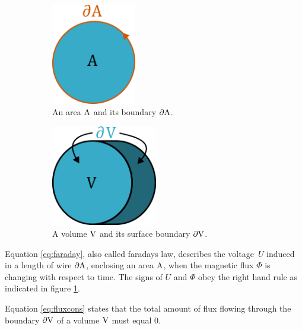 \begin{figure}
    \centering
    \begin{subfigure}[b]{0.4\textwidth}
        \centering
        \includegraphics[height=125pt]{figs/partialA}
        \caption{An area $\mathrm{A}$ and its boundary $\partial \mathrm{A}$. }
        \label{fig:partialA}
    \end{subfigure}
    \hfill
    \begin{subfigure}[b]{0.4\textwidth}
        \centering
        \includegraphics[height=125pt]{figs/partialV}
        \caption{A volume $\mathrm{V}$ and its surface boundary $\partial \mathrm{V}$.}
        \label{fig:partialV}
    \end{subfigure}
    \caption{}
\end{figure}
Equation \ref{eq:faraday}, also called faradays law, describes the voltage\
$U$ induced in a length of wire $\partial\mathrm{A}$, enclosing an area
$\mathrm{A}$, when the magnetic flux $\Phi$ is changing with respect to time.
The signs of $U$ and $\Phi$ obey the right hand rule as indicated
in figure \ref{fig:partialA}.

Equation \ref{eq:fluxcons} states that the total amount of flux flowing
through the boundary $\partial\mathrm{V}$ of a volume
$\mathrm{V}$ must equal 0.\cite[Ch.4.1.1]{russenschuck_field_2011}

